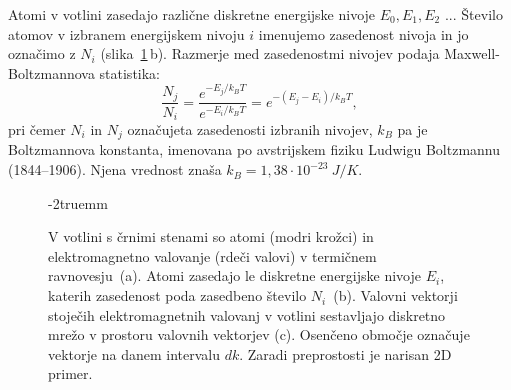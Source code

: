 Atomi v votlini zasedajo različne diskretne energijske nivoje
$E_0, E_1, E_2$ ... Število atomov v izbranem
energijskem nivoju $i$ imenujemo zasedenost nivoja in
jo označimo z $N_i$ (slika~\ref{fig:11_votlina}\,b).
Razmerje med zasedenostmi nivojev podaja
Maxwell-Boltzmannova statistika:
\begin{equation}
\frac{N_j}{N_i} = \frac{e^{-E_j/k_BT}}{e^{-E_i/k_BT}} = e^{-(E_j-E_i)/k_BT},
\label{eq:11_01}
\end{equation}
pri čemer $N_i$ in $N_j$ označujeta zasedenosti izbranih nivojev, $k_B$ pa je 
Boltzmannova konstanta, imenovana po avstrijskem
fiziku Ludwigu Boltzmannu (1844--1906). Njena vrednost znaša 
$k_B = 1,38 \cdot 10^{-23}~\si{J/K}$.
\begin{figure}[ht!]
\centering
\def\svgwidth{130truemm} 

\caption{V votlini s črnimi stenami so atomi (modri krožci) in 
elektromagnetno valovanje (rdeči valovi) v termičnem ravnovesju~(a). 
Atomi zasedajo le diskretne
energijske nivoje $E_i$, katerih zasedenost poda zasedbeno 
število $N_i$~(b). Valovni vektorji stoječih elektromagnetnih 
valovanj v votlini sestavljajo diskretno mrežo v prostoru valovnih vektorjev (c).
Osenčeno območje označuje vektorje na danem intervalu $dk$. Zaradi
preprostosti je narisan 2D primer. 
}
\label{fig:11_votlina}
\vglue-2truemm
\end{figure}


